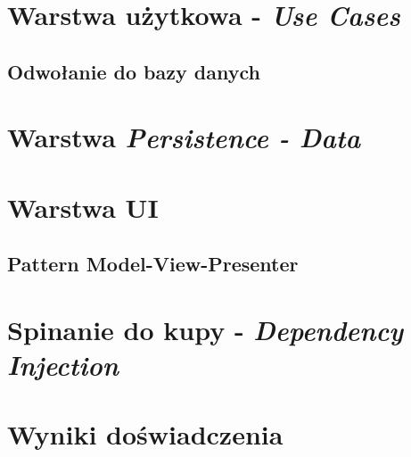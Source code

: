 \section{Warstwa użytkowa - \textit{Use Cases}}
\label{android_use_cases}
\subsection{Odwołanie do bazy danych}

\section{Warstwa \textit{Persistence - Data}}

\section{Warstwa UI}
\subsection{Pattern Model-View-Presenter}

\section{Spinanie do kupy - \textit{Dependency Injection}}

\section{Wyniki doświadczenia}
\label{wyniki_doswiadczenia}